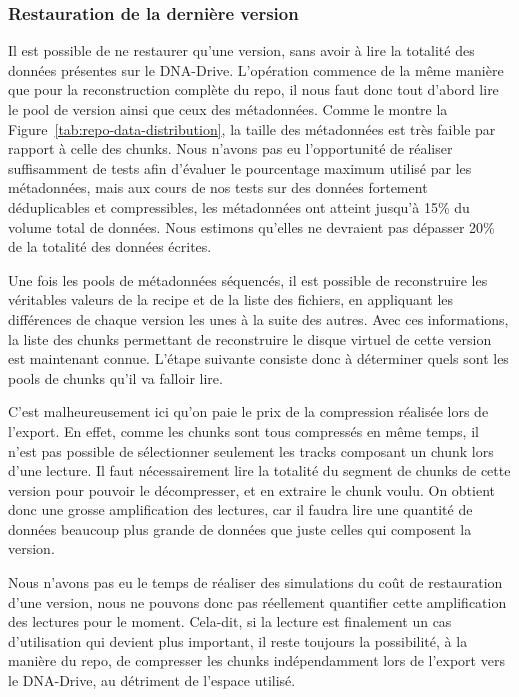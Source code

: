 \documentclass[a4paper]{report}
\begin{document}
\subsubsection{Restauration de la dernière version}

Il est possible de ne restaurer qu'une version,
sans avoir à lire la totalité des données présentes sur le DNA-Drive.
L'opération commence de la même manière que pour la reconstruction complète du repo,
il nous faut donc tout d'abord lire le pool de version ainsi que ceux des métadonnées.
Comme le montre la Figure~\ref{tab:repo-data-distribution},
la taille des métadonnées est très faible par rapport à celle des chunks.
Nous n'avons pas eu l'opportunité de réaliser suffisamment de tests
afin d'évaluer le pourcentage maximum utilisé par les métadonnées,
mais aux cours de nos tests sur des données fortement déduplicables et compressibles,
les métadonnées ont atteint jusqu'à 15\% du volume total de données.
Nous estimons qu'elles ne devraient pas dépasser 20\% de la totalité des données écrites.

Une fois les pools de métadonnées séquencés,
il est possible de reconstruire les véritables valeurs
de la recipe et de la liste des fichiers,
en appliquant les différences de chaque version les unes à la suite des autres.
Avec ces informations, la liste des chunks permettant
de reconstruire le disque virtuel de cette version est maintenant connue.
L'étape suivante consiste donc à déterminer quels sont les pools de chunks qu'il va falloir lire.

C'est malheureusement ici qu'on paie le prix de la compression réalisée lors de l'export.
En effet, comme les chunks sont tous compressés en même temps,
il n'est pas possible de sélectionner seulement les tracks composant un chunk lors d'une lecture.
Il faut nécessairement lire la totalité du segment de chunks de cette version
pour pouvoir le décompresser, et en extraire le chunk voulu.
On obtient donc une grosse amplification des lectures,
car il faudra lire une quantité de données beaucoup plus grande de données que juste celles qui composent la version.

Nous n'avons pas eu le temps de réaliser des simulations du coût de restauration d'une version,
nous ne pouvons donc pas réellement quantifier cette amplification des lectures pour le moment.
Cela-dit, si la lecture est finalement un cas d'utilisation qui devient plus important,
il reste toujours la possibilité, à la manière du repo,
de compresser les chunks indépendamment lors de l'export vers le DNA-Drive,
au détriment de l'espace utilisé.
\end{document}
